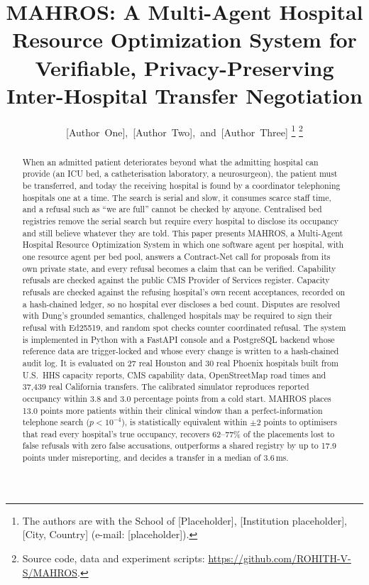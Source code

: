\documentclass[journal]{IEEEtran}
\newcommand{\mahros}{MAHROS}
\begin{document}
\title{MAHROS: A Multi-Agent Hospital Resource Optimization System for Verifiable, Privacy-Preserving Inter-Hospital Transfer Negotiation}

\author{%
  [Author~One],~[Author~Two],~and~[Author~Three]%
  \thanks{The authors are with the School of [Placeholder], [Institution placeholder], [City, Country] (e-mail: [placeholder]).}%
  \thanks{Source code, data and experiment scripts: \url{https://github.com/ROHITH-V-S/MAHROS}.}%
}


\maketitle

\begin{abstract}
When an admitted patient deteriorates beyond what the admitting hospital can provide (an ICU bed, a catheterisation laboratory, a neurosurgeon), the patient must be transferred, and today the receiving hospital is found by a coordinator telephoning hospitals one at a time. The search is serial and slow, it consumes scarce staff time, and a refusal such as ``we are full'' cannot be checked by anyone. Centralised bed registries remove the serial search but require every hospital to disclose its occupancy and still believe whatever they are told. This paper presents \mahros{}, a Multi-Agent Hospital Resource Optimization System in which one software agent per hospital, with one resource agent per bed pool, answers a Contract-Net call for proposals from its own private state, and every refusal becomes a claim that can be verified. Capability refusals are checked against the public CMS Provider of Services register. Capacity refusals are checked against the refusing hospital's own recent acceptances, recorded on a hash-chained ledger, so no hospital ever discloses a bed count. Disputes are resolved with Dung's grounded semantics, challenged hospitals may be required to sign their refusal with Ed25519, and random spot checks counter coordinated refusal. The system is implemented in Python with a FastAPI console and a PostgreSQL backend whose reference data are trigger-locked and whose every change is written to a hash-chained audit log. It is evaluated on 27 real Houston and 30 real Phoenix hospitals built from U.S.\ HHS capacity reports, CMS capability data, OpenStreetMap road times and 37,439 real California transfers. The calibrated simulator reproduces reported occupancy within 3.8 and 3.0 percentage points from a cold start. \mahros{} places 13.0 points more patients within their clinical window than a perfect-information telephone search ($p<10^{-4}$), is statistically equivalent within $\pm2$ points to optimisers that read every hospital's true occupancy, recovers 62--77\% of the placements lost to false refusals with zero false accusations, outperforms a shared registry by up to 17.9 points under misreporting, and decides a transfer in a median of 3.6\,ms.
\end{abstract}
\end{document}
